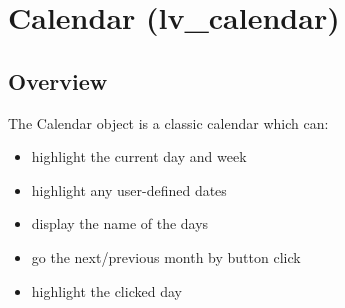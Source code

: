 \documentclass[letterpaper,10pt,english]{sphinxmanual}
\begin{document}
\begin{fulllineitems}
\begin{fulllineitems}
\label{\detokenize{object-types/btnm:_CPPv4N13lv_btnm_ext_t7recolorE}}%
\pysigstartmultiline
{}%
\pysigstopmultiline
\end{fulllineitems}


\begin{fulllineitems}
\label{\detokenize{object-types/btnm:_CPPv4N13lv_btnm_ext_t10one_toggleE}}%
\pysigstartmultiline
{}%
\pysigstopmultiline
\end{fulllineitems}


\end{fulllineitems}



\section{Calendar (lv\_calendar)}
\label{\detokenize{object-types/calendar:calendar-lv-calendar}}\label{\detokenize{object-types/calendar::doc}}

\subsection{Overview}
\label{\detokenize{object-types/calendar:overview}}
The Calendar object is a classic calendar which can:
\begin{itemize}
\item {} 
highlight the current day and week

\item {} 
highlight any user-defined dates

\item {} 
display the name of the days

\item {} 
go the next/previous month by button click

\item {} 
highlight the clicked day

\end{itemize}
\end{document}
